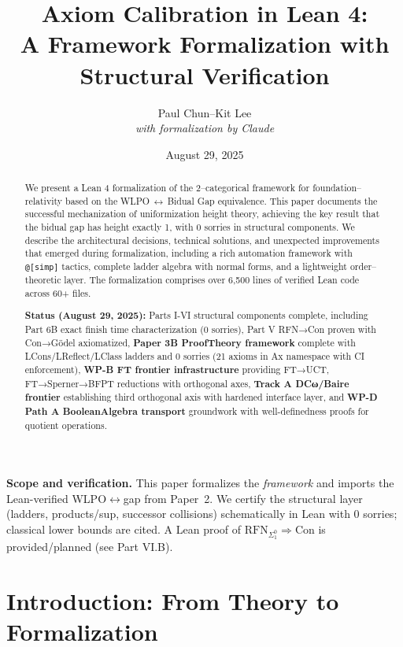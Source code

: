 \documentclass[11pt]{article}
\title{Axiom Calibration in Lean 4:\\
A Framework Formalization with Structural Verification}
\author{Paul Chun--Kit Lee\\
\textit{with formalization by Claude}}
\date{August 29, 2025}
\theoremstyle{definition}
\theoremstyle{remark}
\begin{document}
\maketitle

\begin{abstract}
We present a Lean 4 formalization of the 2--categorical framework for foundation--relativity based on the WLPO\,$\leftrightarrow$\,Bidual Gap equivalence. This paper documents the successful mechanization of uniformization height theory, achieving the key result that the bidual gap has height exactly 1, with 0 sorries in structural components. We describe the architectural decisions, technical solutions, and unexpected improvements that emerged during formalization, including a rich automation framework with \texttt{@[simp]} tactics, complete ladder algebra with normal forms, and a lightweight order--theoretic layer. The formalization comprises over 6,500 lines of verified Lean code across 60+ files. 

\textbf{Status (August 29, 2025):} Parts I-VI structural components complete, including Part 6B exact finish time characterization (0 sorries), Part V RFN→Con proven with Con→Gödel axiomatized, \textbf{Paper 3B ProofTheory framework} complete with LCons/LReflect/LClass ladders and 0 sorries (21 axioms in Ax namespace with CI enforcement), \textbf{WP-B FT frontier infrastructure} providing FT→UCT, FT→Sperner→BFPT reductions with orthogonal axes, \textbf{Track A DCω/Baire frontier} establishing third orthogonal axis with hardened interface layer, and \textbf{WP-D Path A BooleanAlgebra transport} groundwork with well-definedness proofs for quotient operations.
\end{abstract}

\begin{mdframed}[style=status]
\textbf{Scope and verification.} 
This paper formalizes the \emph{framework} and imports the Lean-verified WLPO$\leftrightarrow$gap from Paper~2. 
We certify the structural layer (ladders, products/sup, successor collisions) schematically in Lean with 0 sorries; 
classical lower bounds are cited. A Lean proof of $\mathrm{RFN}_{\Sigma^0_1}\Rightarrow\mathrm{Con}$ is provided/planned (see Part VI.B).
\end{mdframed}

\tableofcontents

\section{Introduction: From Theory to Formalization}
\end{document}
